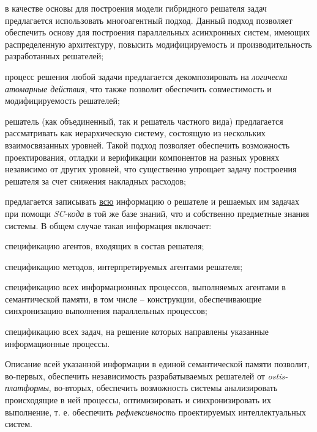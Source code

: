 \begin{textitemize}
\item в качестве основы для построения модели гибридного решателя задач предлагается использовать многоагентный подход. Данный подход позволяет обеспечить основу для построения параллельных асинхронных систем, имеющих распределенную архитектуру, повысить модифицируемость и производительность разработанных решателей;
\item процесс решения любой задачи предлагается декомпозировать на \textit{логически атомарные действия}, что также позволит обеспечить совместимость и модифицируемость решателей;
\item решатель (как объединенный, так и решатель частного вида) предлагается рассматривать как иерархическую систему, состоящую из нескольких взаимосвязанных уровней. Такой подход позволяет обеспечить возможность проектирования, отладки и верификации компонентов на разных уровнях независимо от других уровней, что существенно упрощает задачу построения решателя за счет снижения накладных расходов;
\item предлагается записывать \underline{всю} информацию о решателе и решаемых им задачах при помощи \textit{SC-кода} в той же базе знаний, что и собственно предметные знания системы. В общем случае такая информация включает: 

	\begin{textitemize}
	\item спецификацию агентов, входящих в состав решателя; 
	\item спецификацию методов, интерпретируемых агентами решателя; 
	\item спецификацию всех информационных процессов, выполняемых агентами в семантической памяти, в том числе -- конструкции, обеспечивающие синхронизацию выполнения параллельных процессов;
	\item спецификацию всех задач, на решение которых направлены указанные информационные процессы. 
	\end{textitemize}

Описание всей указанной информации в единой семантической  памяти позволит, во-первых, обеспечить независимость разрабатываемых решателей от \textit{ostis-платформы}, во-вторых, обеспечить возможность системы анализировать происходящие в ней процессы, оптимизировать и синхронизировать их выполнение, т. е. обеспечить \textit{рефлексивность} проектируемых интеллектуальных систем.
\end{textitemize}

